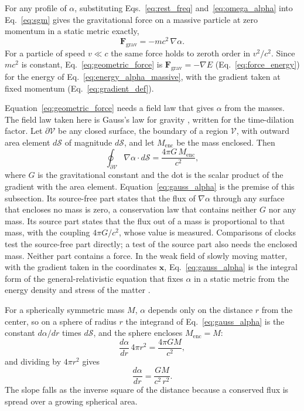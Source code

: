 \documentclass[aps,prd,onecolumn,tightenlines,nofootinbib,notitlepage,11pt,floatfix]{revtex4-2}
\theoremstyle{indentedtheorem}
\begin{document}
For any profile of $\alpha$, substituting Eqs.~\eqref{eq:rest_freq} and~\eqref{eq:omega_alpha} into Eq.~\eqref{eq:sgm} gives the gravitational force on a massive particle at zero momentum in a static metric exactly,
\begin{equation}
    \mathbf{F}_\text{grav} = -mc^2\,\nabla\alpha .
    \label{eq:geometric_force}
\end{equation}
For a particle of speed $v\ll c$ the same force holds to zeroth order in $v^2/c^2$. Since $mc^2$ is constant, Eq.~\eqref{eq:geometric_force} is $\mathbf{F}_\text{grav}=-\nabla E$ (Eq.~\eqref{eq:force_energy}) for the energy of Eq.~\eqref{eq:energy_alpha_massive}, with the gradient taken at fixed momentum (Eq.~\eqref{eq:gradient_def}).

Equation~\eqref{eq:geometric_force} needs a field law that gives $\alpha$ from the masses. The field law taken here is Gauss's law for gravity \citep{Gauss1813Theoria,MTW1973Gravitation}, written for the time-dilation factor. Let $\partial\mathcal{V}$ be any closed surface, the boundary of a region $\mathcal{V}$, with outward area element $d\boldsymbol{\mathcal{S}}$ of magnitude $d\mathcal{S}$, and let $M_\text{enc}$ be the mass enclosed. Then
\begin{equation}
    \oint_{\partial\mathcal{V}}\nabla\alpha\cdot d\boldsymbol{\mathcal{S}} = \frac{4\pi G \, M_\text{enc}}{c^2} ,
    \label{eq:gauss_alpha}
\end{equation}
where $G$ is the gravitational constant and the dot is the scalar product of the gradient with the area element. Equation~\eqref{eq:gauss_alpha} is the premise of this subsection. Its source-free part states that the flux of $\nabla\alpha$ through any surface that encloses no mass is zero, a conservation law that contains neither $G$ nor any mass. Its source part states that the flux out of a mass is proportional to that mass, with the coupling $4\pi G/c^2$, whose value is measured. Comparisons of clocks test the source-free part directly; a test of the source part also needs the enclosed mass. Neither part contains a force. In the weak field of slowly moving matter, with the gradient taken in the coordinates $\mathbf{x}$, Eq.~\eqref{eq:gauss_alpha} is the integral form of the general-relativistic equation that fixes $\alpha$ in a static metric from the energy density and stress of the matter \citep{Gourgoulhon2007Formalism}.

For a spherically symmetric mass $M$, $\alpha$ depends only on the distance $r$ from the center, so on a sphere of radius $r$ the integrand of Eq.~\eqref{eq:gauss_alpha} is the constant $d\alpha/dr$ times $d\mathcal{S}$, and the sphere encloses $M_\text{enc}=M$:
\begin{equation}
    \frac{d\alpha}{dr} \, 4\pi r^2 = \frac{4\pi G M}{c^2} ,
    \label{eq:gauss_sphere}
\end{equation}
and dividing by $4\pi r^2$ gives
\begin{equation}
    \frac{d\alpha}{dr} = \frac{GM}{c^2 \, r^2} .
    \label{eq:dalpha_dr}
\end{equation}
The slope falls as the inverse square of the distance because a conserved flux is spread over a growing spherical area.
\end{document}
